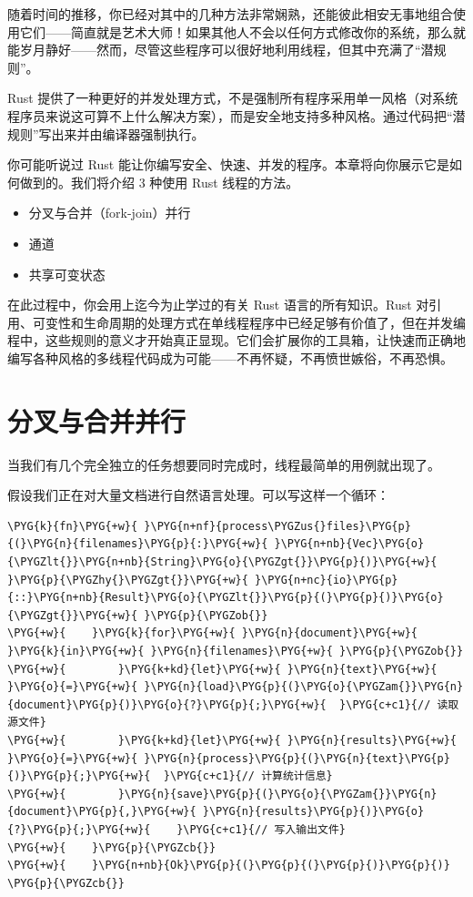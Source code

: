 随着时间的推移，你已经对其中的几种方法非常娴熟，还能彼此相安无事地组合使用它们——简直就是艺术大师！如果其他人不会以任何方式修改你的系统，那么就能岁月静好——然而，尽管这些程序可以很好地利用线程，但其中充满了“潜规则”。

Rust 提供了一种更好的并发处理方式，不是强制所有程序采用单一风格（对系统程序员来说这可算不上什么解决方案），而是安全地支持多种风格。通过代码把“潜规则”写出来并由编译器强制执行。

你可能听说过 Rust 能让你编写安全、快速、并发的程序。本章将向你展示它是如何做到的。我们将介绍 3 种使用 Rust 线程的方法。

\begin{itemize}
\item 分叉与合并（fork-join）并行
\item 通道
\item 共享可变状态
\end{itemize}

在此过程中，你会用上迄今为止学过的有关 Rust 语言的所有知识。Rust 对引用、可变性和生命周期的处理方式在单线程程序中已经足够有价值了，但在并发编程中，这些规则的意义才开始真正显现。它们会扩展你的工具箱，让快速而正确地编写各种风格的多线程代码成为可能——不再怀疑，不再愤世嫉俗，不再恐惧。

\section{分叉与合并并行}

当我们有几个完全独立的任务想要同时完成时，线程最简单的用例就出现了。

假设我们正在对大量文档进行自然语言处理。可以写这样一个循环：

\begin{Verbatim}[commandchars=\\\{\},breaklines=true,breakanywhere=true,fontsize=\codefont,xleftmargin=17bp]
\PYG{k}{fn}\PYG{+w}{ }\PYG{n+nf}{process\PYGZus{}files}\PYG{p}{(}\PYG{n}{filenames}\PYG{p}{:}\PYG{+w}{ }\PYG{n+nb}{Vec}\PYG{o}{\PYGZlt{}}\PYG{n+nb}{String}\PYG{o}{\PYGZgt{}}\PYG{p}{)}\PYG{+w}{ }\PYG{p}{\PYGZhy{}\PYGZgt{}}\PYG{+w}{ }\PYG{n+nc}{io}\PYG{p}{::}\PYG{n+nb}{Result}\PYG{o}{\PYGZlt{}}\PYG{p}{(}\PYG{p}{)}\PYG{o}{\PYGZgt{}}\PYG{+w}{ }\PYG{p}{\PYGZob{}}
\PYG{+w}{    }\PYG{k}{for}\PYG{+w}{ }\PYG{n}{document}\PYG{+w}{ }\PYG{k}{in}\PYG{+w}{ }\PYG{n}{filenames}\PYG{+w}{ }\PYG{p}{\PYGZob{}}
\PYG{+w}{        }\PYG{k+kd}{let}\PYG{+w}{ }\PYG{n}{text}\PYG{+w}{ }\PYG{o}{=}\PYG{+w}{ }\PYG{n}{load}\PYG{p}{(}\PYG{o}{\PYGZam{}}\PYG{n}{document}\PYG{p}{)}\PYG{o}{?}\PYG{p}{;}\PYG{+w}{  }\PYG{c+c1}{// 读取源文件}
\PYG{+w}{        }\PYG{k+kd}{let}\PYG{+w}{ }\PYG{n}{results}\PYG{+w}{ }\PYG{o}{=}\PYG{+w}{ }\PYG{n}{process}\PYG{p}{(}\PYG{n}{text}\PYG{p}{)}\PYG{p}{;}\PYG{+w}{  }\PYG{c+c1}{// 计算统计信息}
\PYG{+w}{        }\PYG{n}{save}\PYG{p}{(}\PYG{o}{\PYGZam{}}\PYG{n}{document}\PYG{p}{,}\PYG{+w}{ }\PYG{n}{results}\PYG{p}{)}\PYG{o}{?}\PYG{p}{;}\PYG{+w}{    }\PYG{c+c1}{// 写入输出文件}
\PYG{+w}{    }\PYG{p}{\PYGZcb{}}
\PYG{+w}{    }\PYG{n+nb}{Ok}\PYG{p}{(}\PYG{p}{(}\PYG{p}{)}\PYG{p}{)}
\PYG{p}{\PYGZcb{}}
\end{Verbatim}

